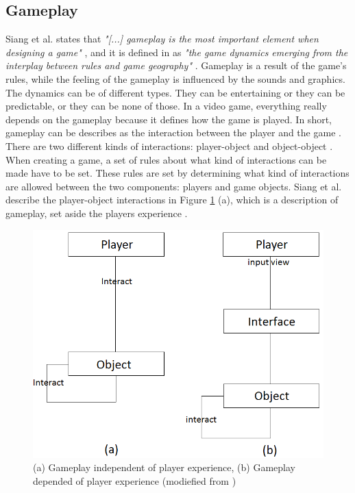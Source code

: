 \subsection{Gameplay}

Siang et al. states that \emph{"[...] gameplay is the most important element when designing a game"} \cite{umlapproach}, and it is defined in \cite{understandingvg} as \emph{"the game dynamics emerging from the interplay between rules and game geography"} . Gameplay is a result of the game's rules, while the feeling of the gameplay is influenced by the sounds and graphics. The dynamics can be of different types. They can be entertaining or they can be predictable, or they can be none of those. In a video game, everything really depends on the gameplay because it defines how the game is played. In short, gameplay can be describes as the interaction between the player and the game \cite{umlapproach}. There are two different kinds of interactions: player-object and object-object \cite{umlapproach}. When creating a game, a set of rules about what kind of interactions can be made have to be set. These rules are set by determining what kind of interactions are allowed between the two components: players and game objects. Siang et al. describe the player-object interactions in Figure \ref{fig:playerobject} (a), which is a description of gameplay, set aside the players experience \cite{umlapproach}.
\begin{figure}
\begin{center}
\includegraphics[scale=0.4]{player-object-merged}
\caption[The player-token interaction]{(a) Gameplay independent of player experience, (b) Gameplay depended of player experience (modiefied from \cite{umlapproach})}
\label{fig:playerobject}
\end{center}
\end{figure} 



